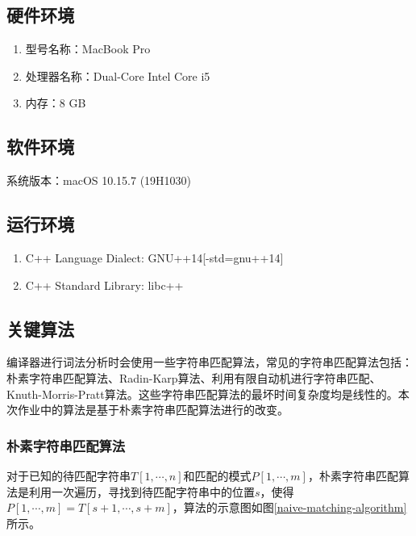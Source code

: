 \documentclass[11pt]{homework}
\begin{document}
\maketitle


  \subsection*{硬件环境}
  \begin{enumerate}
    \item 型号名称：MacBook Pro
    \item 处理器名称：Dual-Core Intel Core i5
    \item 内存：8 GB
  \end{enumerate}

  \subsection*{软件环境}

  系统版本：macOS 10.15.7 (19H1030)

  \subsection*{运行环境}

  \begin{enumerate}
    \item C++ Language Dialect: GNU++14[-std=gnu++14]
    \item C++ Standard Library: libc++
  \end{enumerate}


  \subsection*{关键算法}

  编译器进行词法分析时会使用一些字符串匹配算法，常见的字符串匹配算法包括：朴素字符串匹配算法、Radin-Karp算法、利用有限自动机进行字符串匹配、Knuth-Morris-Pratt算法。这些字符串匹配算法的最坏时间复杂度均是线性的。本次作业中的算法是基于朴素字符串匹配算法进行的改变。

  \subsubsection*{朴素字符串匹配算法}

  对于已知的待匹配字符串$T[1, \cdots, n]$和匹配的模式$P[1, \cdots, m]$，朴素字符串匹配算法是利用一次遍历，寻找到待匹配字符串中的位置$s$，使得$P[1, \cdots, m] = T[s+1, \cdots, s+m]$，算法的示意图如图\ref{naive-matching-algorithm}所示。
\end{document}
